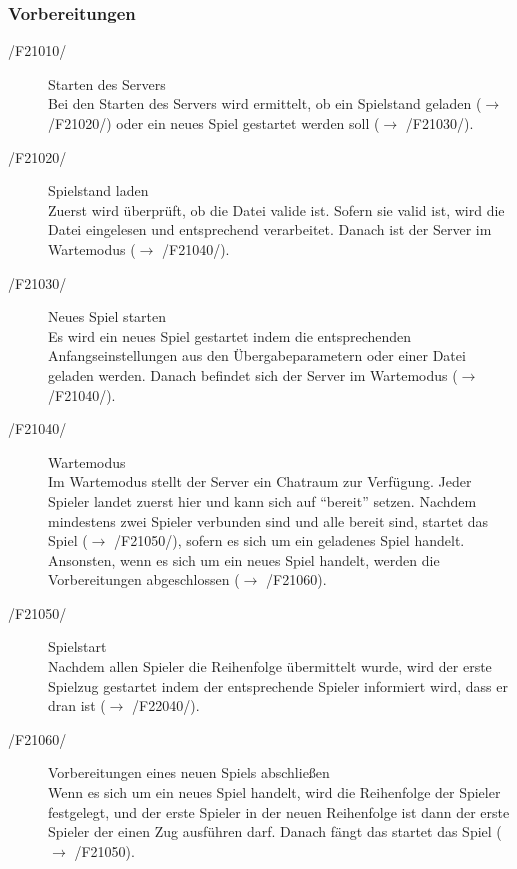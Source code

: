 \documentclass[a4paper,10pt]{article}
\begin{document}
\subsubsection{Vorbereitungen}
\begin{description}
\item[/F21010/] Starten des Servers \\
Bei den Starten des Servers wird ermittelt, ob ein Spielstand geladen ($\rightarrow$ /F21020/) oder ein neues Spiel gestartet werden soll ($\rightarrow$ /F21030/).
\item[/F21020/] Spielstand laden \\
Zuerst wird überprüft, ob die Datei valide ist. Sofern sie valid ist, wird die Datei eingelesen und entsprechend verarbeitet. Danach ist der Server im Wartemodus ($\rightarrow$ /F21040/).
\item[/F21030/] Neues Spiel starten \\
Es wird ein neues Spiel gestartet indem die entsprechenden Anfangseinstellungen aus den Übergabeparametern oder einer Datei geladen werden. Danach befindet sich der Server im Wartemodus ($\rightarrow$ /F21040/).
\item[/F21040/] Wartemodus \\
Im Wartemodus stellt der Server ein Chatraum zur Verfügung. Jeder Spieler landet zuerst hier und kann sich auf "`bereit"' setzen. Nachdem mindestens zwei Spieler verbunden sind und alle bereit sind, startet das Spiel ($\rightarrow$ /F21050/), sofern es sich um ein geladenes Spiel handelt. Ansonsten, wenn es sich um ein neues Spiel handelt, werden die Vorbereitungen abgeschlossen ($\rightarrow$ /F21060).
\item[/F21050/] Spielstart \\
Nachdem allen Spieler die Reihenfolge übermittelt wurde, wird der erste Spielzug gestartet indem der entsprechende Spieler informiert wird, dass er dran ist ($\rightarrow$ /F22040/).
\item[/F21060/] Vorbereitungen eines neuen Spiels abschließen \\
Wenn es sich um ein neues Spiel handelt, wird die Reihenfolge der Spieler festgelegt, und der erste Spieler in der neuen Reihenfolge ist dann der erste Spieler der einen Zug ausführen darf. Danach fängt das startet das Spiel ($\rightarrow$ /F21050).
\end{description}
\end{document}
